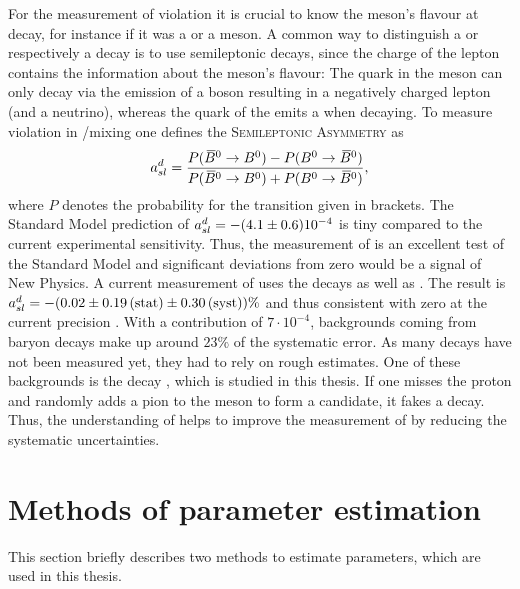 For the measurement of \CP violation it is crucial to know the meson's flavour at decay, for instance if it was a \Bd or a \Bdb meson.
A common way to distinguish a \Bd or respectively a \Bdb decay is to use semileptonic decays, since the charge of the lepton contains the information about the meson's flavour:
The \bquark quark in the \Bd meson can only decay via the emission of a \Wm boson resulting in a negatively charged lepton (and a neutrino), whereas the \bquarkbar quark of the \Bdb emits a \Wp when decaying.
To measure \CP violation in \Bd/\Bdb mixing one defines the \textsc{Semileptonic Asymmetry} \asld as
\begin{align}
    a_{sl}^d = \frac{P({{\kern 0.18em\overline{\kern -0.18em B}{}}{}^0} \rightarrow {\ensuremath{{B}^0}}) - P({{B}^0} \rightarrow {\ensuremath{{\kern 0.18em\overline{\kern -0.18em B}{}}{}^0}})}{P({{\kern 0.18em\overline{\kern -0.18em B}{}}{}^0} \rightarrow {\ensuremath{{B}^0}}) + P({{B}^0} \rightarrow {\ensuremath{{\kern 0.18em\overline{\kern -0.18em B}{}}{}^0}})},
\end{align}
where $P$ denotes the probability for the transition given in brackets.
The Standard Model prediction of $a_{sl}^d = -(4.1 \pm 0.6) 10^{-4}$ \cite{asld_SM} is tiny compared to the current experimental sensitivity.
Thus, the measurement of \asld is an excellent test of the Standard Model and significant deviations from zero would be a signal of New Physics.
A current \lhcb measurement of \asld uses the decays  as well as .
The result is $a_{sl}^d = -(0.02 \pm 0.19\mathrm{\,(stat)} \pm 0.30\mathrm{\,(syst)})\%$ and thus consistent with zero at the current precision \cite{asld_LHCb}.
With a contribution of $7\cdot 10^{-4}$, backgrounds coming from \Lb baryon decays make up around $23\%$ of the systematic error. As many \Lb decays have not been measured yet, they had to rely on rough estimates.
One of these backgrounds is the decay \LbToDpmunuX, which is studied in this thesis.
If one misses the proton and randomly adds a pion to the \Dz meson to form a \Dstar candidate, it fakes a  decay.
Thus, the understanding of \LbToDpmunuX helps to improve the measurement of \asld by reducing the systematic uncertainties.

\section{Methods of parameter estimation}
This section briefly describes two methods to estimate parameters, which are used in this thesis.

